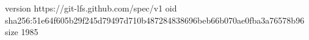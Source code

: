 version https://git-lfs.github.com/spec/v1
oid sha256:51e64f605b29f245d79497d710b487284838696beb66b070ae0fba3a76578b96
size 1985

